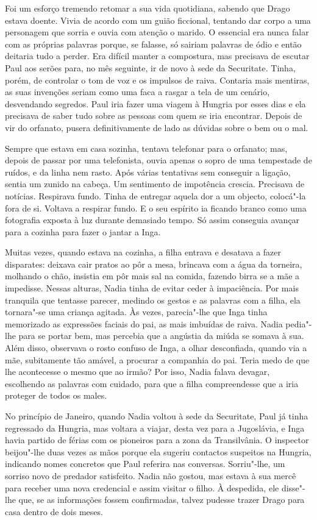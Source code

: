 Foi um esforço tremendo retomar a sua vida quotidiana, sabendo que Drago estava doente. Vivia de acordo com um guião
ficcional, tentando dar corpo a uma personagem que sorria e ouvia com
atenção o marido. O essencial era nunca falar com as próprias palavras
porque, se falasse, só sairiam palavras de ódio e então deitaria tudo a
perder. Era difícil manter a compostura, mas precisava de escutar Paul
aos serões para, no mês seguinte, ir de novo à sede da Securitate.
Tinha, porém, de controlar o tom de voz e os impulsos de raiva. Contaria
mais mentiras, as suas invenções seriam como uma faca a rasgar a tela de
um cenário, desvendando segredos. Paul iria fazer uma viagem à Hungria
por esses dias e ela precisava de saber tudo sobre as pessoas com quem
se iria encontrar. Depois de vir do orfanato, pusera definitivamente de
lado as dúvidas sobre o bem ou o mal.

\bigskip

Sempre que estava em casa sozinha, tentava telefonar para o orfanato;
mas, depois de passar por uma telefonista, ouvia apenas o sopro de uma
tempestade de ruídos, e da linha nem rasto. Após várias tentativas sem
conseguir
a ligação, sentia um zunido na cabeça. Um sentimento de impotência
crescia. Precisava de notícias. Respirava fundo. Tinha de entregar
aquela dor a um objecto, colocá"-la fora de si. Voltava a respirar fundo.
E o seu espírito ia ficando branco como uma fotografia exposta à luz
durante demasiado tempo. Só assim conseguia avançar para a cozinha
para fazer o jantar a Inga.

Muitas vezes, quando estava na cozinha, a filha entrava e desatava a
fazer disparates: deixava cair pratos ao pôr a mesa, brincava com a água
da torneira, molhando o chão, insistia em pôr mais sal na comida,
fazendo birra se a mãe a impedisse. Nessas alturas, Nadia tinha de
evitar ceder à impaciência. Por mais tranquila que tentasse parecer,
medindo os gestos e as palavras com a filha, ela tornara"-se uma criança
agitada. Às vezes, parecia"-lhe que Inga tinha memorizado as expressões
faciais do pai, as mais imbuídas de raiva. Nadia pedia"-lhe para se
portar bem, mas percebia que a angústia da miúda se somava à sua. Além
disso, observava o rosto confuso de Inga, a olhar desconfiada, quando
via a mãe, subitamente tão amável, a procurar a companhia do pai. Teria
medo de que lhe acontecesse o mesmo que ao irmão? Por isso, Nadia falava
devagar, escolhendo as palavras com cuidado, para que a filha
compreendesse que a iria proteger de todos os males.

No princípio de Janeiro, quando Nadia voltou à sede
da Securitate, Paul já tinha regressado da Hungria, mas voltara a
viajar, desta vez para a Jugoslávia, e Inga havia partido de férias com
os pioneiros para a zona da Transilvânia. O inspector beijou"-lhe duas
vezes as mãos porque ela sugeriu contactos suspeitos na Hungria,
indicando
nomes concretos que Paul referira nas conversas. Sorriu"-lhe, um sorriso novo de predador satisfeito. Nadia não gostou, mas
estava à sua mercê para receber uma nova credencial e assim visitar o
filho. À despedida, ele disse"-lhe que, se as informações fossem
confirmadas, talvez pudesse trazer Drago para casa dentro de dois meses.

